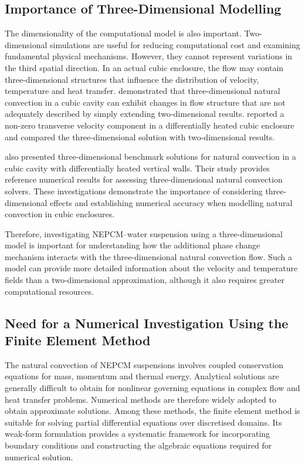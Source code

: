 \subsection{Importance of Three-Dimensional Modelling}

The dimensionality of the computational model is also important. Two-dimensional simulations are useful for reducing computational cost and examining fundamental physical mechanisms. However, they cannot represent variations in the third spatial direction. In an actual cubic enclosure, the flow may contain three-dimensional structures that influence the distribution of velocity, temperature and heat transfer. \citet{tric2000} demonstrated that three-dimensional natural convection in a cubic cavity can exhibit changes in flow structure that are not adequately described by simply extending two-dimensional results. \citet{fusegi1991} reported a non-zero transverse velocity component in a differentially heated cubic enclosure and compared the three-dimensional solution with two-dimensional results.

\citet{wakashima2004} also presented three-dimensional benchmark solutions for natural convection in a cubic cavity with differentially heated vertical walls. Their study provides reference numerical results for assessing three-dimensional natural convection solvers. These investigations demonstrate the importance of considering three-dimensional effects and establishing numerical accuracy when modelling natural convection in cubic enclosures.

Therefore, investigating NEPCM--water suspension using a three-dimensional model is important for understanding how the additional phase change mechanism interacts with the three-dimensional natural convection flow. Such a model can provide more detailed information about the velocity and temperature fields than a two-dimensional approximation, although it also requires greater computational resources.

\subsection{Need for a Numerical Investigation Using the Finite Element Method}

The natural convection of NEPCM suspensions involves coupled conservation equations for mass, momentum and thermal energy. Analytical solutions are generally difficult to obtain for nonlinear governing equations in complex flow and heat transfer problems. Numerical methods are therefore widely adopted to obtain approximate solutions. Among these methods, the finite element method is suitable for solving partial differential equations over discretised domains. Its weak-form formulation provides a systematic framework for incorporating boundary conditions and constructing the algebraic equations required for numerical solution.

